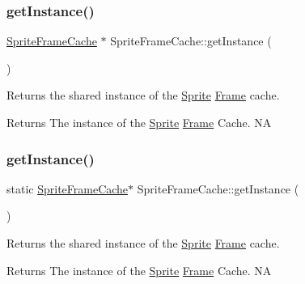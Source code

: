 \subsubsection{\texorpdfstring{get\+Instance()}{getInstance()}\hspace{0.1cm}{\footnotesize\ttfamily [1/2]}}
{\footnotesize\ttfamily \hyperlink{classSpriteFrameCache}{Sprite\+Frame\+Cache} $\ast$ Sprite\+Frame\+Cache\+::get\+Instance (\begin{DoxyParamCaption}{ }\end{DoxyParamCaption})\hspace{0.3cm}{\ttfamily [static]}}

Returns the shared instance of the \hyperlink{classSprite}{Sprite} \hyperlink{classFrame}{Frame} cache.

\begin{DoxyReturn}{Returns}
The instance of the \hyperlink{classSprite}{Sprite} \hyperlink{classFrame}{Frame} Cache.  NA 
\end{DoxyReturn}
\mbox{\label{classSpriteFrameCache_a0ebc800732ea727e2c355f0dfa154229}} 
\subsubsection{\texorpdfstring{get\+Instance()}{getInstance()}\hspace{0.1cm}{\footnotesize\ttfamily [2/2]}}
{\footnotesize\ttfamily static \hyperlink{classSpriteFrameCache}{Sprite\+Frame\+Cache}$\ast$ Sprite\+Frame\+Cache\+::get\+Instance (\begin{DoxyParamCaption}{ }\end{DoxyParamCaption})\hspace{0.3cm}{\ttfamily [static]}}

Returns the shared instance of the \hyperlink{classSprite}{Sprite} \hyperlink{classFrame}{Frame} cache.

\begin{DoxyReturn}{Returns}
The instance of the \hyperlink{classSprite}{Sprite} \hyperlink{classFrame}{Frame} Cache.  NA 
\end{DoxyReturn}
\mbox{\label{classSpriteFrameCache_a36ba54daea85ff2c8a3dd6f3525eb17e}} 

